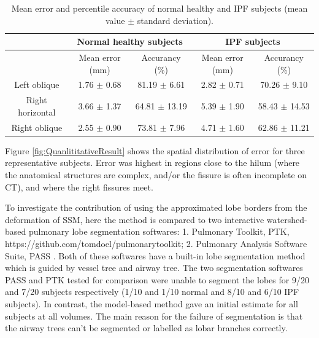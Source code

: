 \documentclass[]{spie}  %
\begin{document}
{\begin{table}[htbp]
\centering
\caption{Mean error and percentile accuracy of normal healthy and IPF subjects (mean value $\pm$ standard deviation).}
\label{tab:QuantitativeResult}
\begin{tabular}{| c | c | c | c | c |}
\hline
~ & \multicolumn{2}{|c|}{\bf{Normal healthy subjects}} & \multicolumn{2}{|c|}{\bf{IPF subjects}}\\ 
\hline
~ & Mean error (mm) & Accurancy (\%) & Mean error (mm) & Accurancy (\%)\\	
\hline
Left oblique & 1.76 $\pm$ 0.68 & 81.19 $\pm$ 6.61 & 2.82 $\pm$ 0.71 & 70.26 $\pm$ 9.10\\
\hline
Right horizontal & 3.66 $\pm$ 1.37 & 64.81 $\pm$ 13.19 & 5.39 $\pm$ 1.90 & 58.43 $\pm$ 14.53\\
\hline
Right oblique & 2.55 $\pm$ 0.90 & 73.81 $\pm$ 7.96 & 4.71 $\pm$ 1.60 & 62.86 $\pm$ 11.21\\						
\hline
\end{tabular}
\end{table}

Figure \ref{fig:QuanlititativeResult} shows the spatial distribution of error for three representative subjects. Error was highest in regions close to the hilum (where the anatomical structures are complex, and/or the fissure is often incomplete on CT), and where the right fissures meet. 

To investigate the contribution of using the approximated lobe borders from the deformation of SSM, here the method is compared to two interactive watershed-based pulmonary lobe segmentation softwares: 1. Pulmonary Toolkit, PTK, https://github.com/tomdoel/pulmonarytoolkit; 2. Pulmonary Analysis Software Suite, PASS \cite{guo2008pulmonary}. Both of these softwares have a built-in lobe segmentation method which is guided by vessel tree and airway tree. The two segmentation softwares PASS and PTK tested for comparison were unable to segment the lobes for 9/20 and 7/20 subjects respectively (1/10 and 1/10 normal and 8/10 and 6/10 IPF subjects). In contrast, the model-based method gave an initial estimate for all subjects at all volumes. The main reason for the failure of segmentation is that the airway trees can't be segmented or labelled as lobar branches correctly.

}
\end{document}
